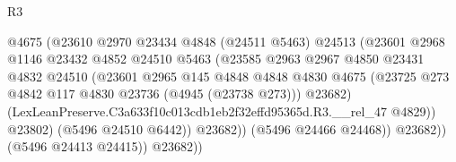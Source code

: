\begin{lexlean}{R3}
\begin{coremodule}
                                            @4675
                                            (@23610
                                              @2970
                                              @23434
                                              @4848
                                              (@24511 @5463)
                                              @24513
                                              (@23601
                                                @2968
                                                @1146
                                                @23432
                                                @4852
                                                @24510
                                                @5463
                                                (@23585
                                                  @2963
                                                  @2967
                                                  @4850
                                                  @23431
                                                  @4832
                                                  @24510
                                                  (@23601
                                                    @2965
                                                    @145
                                                    @4848
                                                    @4848
                                                    @4830
                                                    @4675
                                                    (@23725
                                                      @273
                                                      @4842
                                                      @117
                                                      @4830
                                                      @23736
                                                      (@4945 (@23738 @273)))
                                                    @23682)
                                                  (LexLeanPreserve.C3a633f10c013cdb1eb2f32effd95365d.R3.__rel_47
                                                    @4829))
                                                @23802)
                                              (@5496 @24510 @6442))
                                            @23682))
                                        (@5496 @24466 @24468))
                                      @23682))
                                  (@5496 @24413 @24415))
                                @23682))

\end{coremodule}
\end{lexlean}

